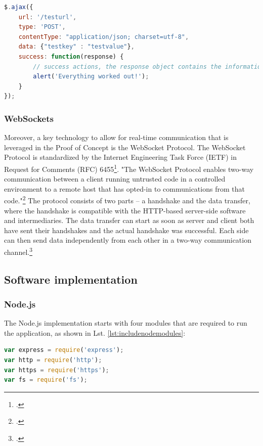 \begin{lstlisting}[float,
language=javascript,
caption={Exemplary jQuery AJAX call},
label={lst:jqueryajaxcall}]
$.ajax({
    url: '/testurl',
    type: 'POST',
    contentType: "application/json; charset=utf-8",
    data: {"testkey" : "testvalue"},
    success: function(response) {
        // success actions, the response object contains the information sent from the server
        alert('Everything worked out!');
    }
});
\end{lstlisting}%

\subsubsection{WebSockets}
\label{websockets}
Moreover, a key technology to allow for real-time communication that is leveraged
in the Proof of Concept is the WebSocket Protocol. The WebSocket Protocol is standardized
by the Internet Engineering Task Force (IETF) in Request for Comments (RFC)
6455\footcite[Cf.][]{rfc6455}. "The WebSocket Protocol enables two-way
communication between a client running untrusted code in a controlled
environment to a remote host that has opted-in to communications from that
code."\footcite[.][]{rfc6455} The protocol consists of two parts – a handshake
and the data transfer, where the handshake is compatible with the HTTP-based
server-side software and intermediaries. The data transfer can start as
soon as server and client both have sent their handshakes and the actual
handshake was successful. Each side can then send data independently from each
other in a two-way communication channel.\footcite[Cf.][]{rfc6455}



\FloatBarrier
\subsection{Software implementation}
\label{software_implementation}

\subsubsection{Node.js}
\label{implementation_node}
The Node.js implementation starts with four modules that are required to run the application, as shown in Lst. \ref{lst:includenodemodules}:

\begin{lstlisting}[language=javascript,caption={Including modules},label=lst:includenodemodules]
var express = require('express');
var http = require('http');
var https = require('https');
var fs = require('fs');
\end{lstlisting}


